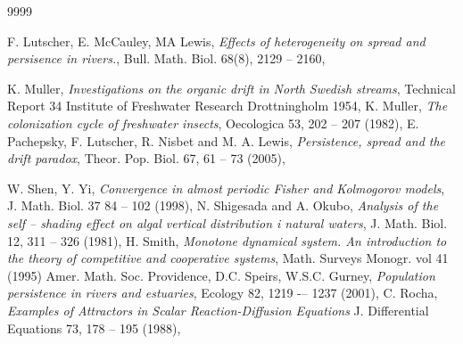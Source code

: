 \begin{thebibliography}{9999}
		
		F. Lutscher, E. McCauley, MA Lewis, \emph{Effects of heterogeneity on spread and persisence in rivers.}, 
		Bull. Math. Biol. 68(8), 2129 -- 2160,
		
		K. Muller,
		\emph{Investigations on the organic drift in North Swedish streams},
		Technical Report 34 Institute of Freshwater Research Drottningholm 1954,
		K. Muller, 
		\emph{The colonization cycle of freshwater insects},
		Oecologica 53, 202 -- 207 (1982),
		E. Pachepsky, F. Lutscher, R. Nisbet and M. A. Lewis, 
		\emph{Persistence, spread and the drift paradox},
		Theor. Pop. Biol. 67,  61 -- 73 (2005),
	
		W. Shen, Y. Yi,
		\emph{Convergence in almost periodic Fisher and Kolmogorov models},
		J. Math. Biol. 37 84 -- 102 (1998),
		N. Shigesada and A. Okubo,
		\emph{Analysis of the self -- shading effect on algal vertical distribution i natural waters},
		J. Math. Biol. 12, 311 -- 326  (1981),
		H. Smith, 
		\emph{ Monotone dynamical system. An introduction to the theory of competitive and cooperative systems},
		Math. Surveys Monogr. vol 41 (1995) Amer. Math. Soc. Providence,
		D.C. Speirs, W.S.C. Gurney, 
		\emph{Population persistence in rivers and estuaries}, 
		Ecology 82, 1219 -– 1237 (2001),
		C. Rocha,
		\emph{Examples of Attractors
			in Scalar Reaction-Diffusion Equations} 
		J. Differential Equations 73, 178 -- 195 (1988),
		

\end{thebibliography}
